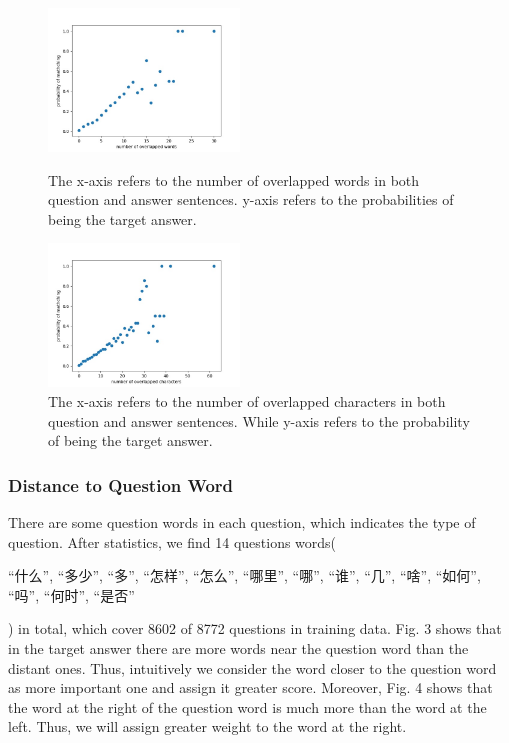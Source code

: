 \documentclass{llncs}
\begin{document}
\begin{figure}
\centering
\begin{minipage}{.45\textwidth}
  \includegraphics[width=2in]{overlap-words.jpg}
  \caption[width=\textwidth]{The x-axis refers to the number of
overlapped words in both question and answer sentences. y-axis refers to the probabilities of being the target answer.}
\end{minipage}%
\hfill
\begin{minipage}{.45\textwidth}
  \includegraphics[width=2in]{overlap-characters.jpg}
  \caption[width=\textwidth]{The x-axis refers to the number of
overlapped characters in both question and
answer sentences. While y-axis refers to the
probability of being the target answer.}
\end{minipage}
\end{figure}

\subsubsection{Distance to Question Word}
There are some question words in each question, which indicates the type of question. After statistics, we find 14 questions words(\begin{CJK}{UTF8}{gbsn}
“什么”, “多少”, “多”, “怎样”, “怎么”, “哪里”, “哪”, “谁”, “几”, “啥”, “如何”, “吗”, “何时”, “是否”
\end{CJK}) in total, which cover 8602 of 8772 questions in training data. Fig. 3 shows that in the target answer there are more words near the question word than the distant ones. Thus, intuitively we consider the word closer to the question word as more important one and assign it greater score. Moreover, Fig. 4 shows that the word at the right of the question word is much more than the word at the left. Thus, we will assign greater weight to the word at the right. 
\end{document}
